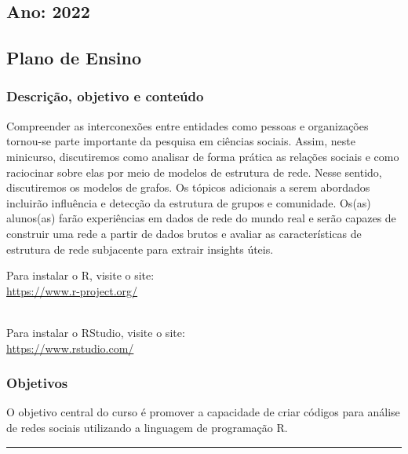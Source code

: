 \documentclass[
]{article}
\def\fullboxbegin{
\bigskip
\begin{tcolorbox}[colback=color1,colframe=color1,coltext=white,arc=0mm,boxrule=0pt]
}
\def\fullboxend{\end{tcolorbox}\medskip}
\begin{document}
\hypertarget{ano-2022}{%
\subsection{Ano: 2022}\label{ano-2022}}

\fullboxbegin

\hypertarget{plano-de-ensino}{%
\subsection{Plano de Ensino}\label{plano-de-ensino}}

\fullboxend

\hypertarget{descriuxe7uxe3o-objetivo-e-conteuxfado}{%
\subsubsection{Descrição, objetivo e
conteúdo}\label{descriuxe7uxe3o-objetivo-e-conteuxfado}}

Compreender as interconexões entre entidades como pessoas e organizações
tornou-se parte importante da pesquisa em ciências sociais. Assim, neste
minicurso, discutiremos como analisar de forma prática as relações
sociais e como raciocinar sobre elas por meio de modelos de estrutura de
rede. Nesse sentido, discutiremos os modelos de grafos. Os tópicos
adicionais a serem abordados incluirão influência e detecção da
estrutura de grupos e comunidade. Os(as) alunos(as) farão experiências
em dados de rede do mundo real e serão capazes de construir uma rede a
partir de dados brutos e avaliar as características de estrutura de rede
subjacente para extrair insights úteis.

\fullboxbegin

Para instalar o R, visite o site:\\
\url{https://www.r-project.org/}\strut \\
Para instalar o RStudio, visite o site:\\
\url{https://www.rstudio.com/}

\fullboxend

\hypertarget{objetivos}{%
\subsubsection{Objetivos}\label{objetivos}}

O objetivo central do curso é promover a capacidade de criar códigos
para análise de redes sociais utilizando a linguagem de programação R.

\begin{center}\rule{0.5\linewidth}{0.5pt}\end{center}
\end{document}
